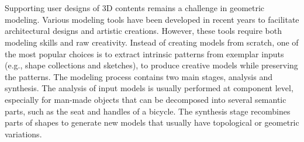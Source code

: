 

\chapter*{}




Supporting user designs of 3D contents remains a challenge in geometric modeling. Various modeling tools have been developed in recent years to facilitate architectural designs and artistic creations. However, these tools require both modeling skills and raw creativity. Instead of creating models from scratch, one of the most popular choices is to extract intrinsic patterns from exemplar inputs (e.g., shape collections and sketches), to produce creative models while preserving the patterns. The modeling process contains two main stages, analysis and synthesis. The analysis of input models is usually performed at component level, especially for man-made objects that can be decomposed into several semantic parts, such as the seat and handles of a bicycle. The synthesis stage recombines parts of shapes to generate new models that usually have topological or geometric variations.


